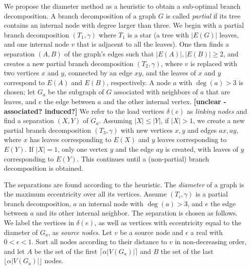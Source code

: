 We propose the diameter method \cite{misc:Hicks04} as a heuristic to obtain a sub-optimal branch decomposition.
A branch decomposition of a graph $G$ is called {\em partial} if its tree contains an internal node with degree larger than three. 
We begin with a partial branch decomposition $(T_1, \gamma)$ where $T_1$ is a star (a tree with $|E(G)|$ leaves, and one internal node $v$ that is adjacent to all the leaves).
One then finds a separation $(A,B)$ of the graph's edges such that $|E(A)|, |E(B)| \geq 2$, and creates a new partial branch decomposition $(T_2, \gamma)$, where $v$ is replaced with two vertices $x$ and $y$, connected by an edge $xy$, and the leaves of $x$ and $y$ correspond to $E(A)$ and $E(B)$, respectively.
A node $a$ with $\deg(a)>3$ is chosen; let $G_a$ be the subgraph of $G$ associated with neighbors of $a$ that are leaves, and $e$ the edge between $a$ and the other internal vertex. \textbf{[unclear - associated? induced?]}
We refer to the load vertices $\delta(e)$ as {\em linking nodes} and find a separation $(X,Y)$ of $G_a$.
Assuming $|X| \leq |Y|$, if $|X|>1$, we create a new partial branch decomposition $(T_3, \gamma)$ with new vertices $x,y$ and edges $ax, ay$, where $x$ has leaves corresponding to $E(X)$ and $y$ leaves corresponding to $E(Y)$.
If $|X|=1$, only one vertex $y$ and the edge $ay$ is created, with leaves of $y$ corresponding to $E(Y)$.
This continues until a (non-partial) branch decomposition is obtained.

The separations are found according to the heuristic.
The {\em diameter} of a graph is the maximum eccentricity over all its vertices.
Assume $(T_i, \gamma)$ is a partial branch decomposition, $a$ an internal node with $\deg(a) > 3$, and $e$ the edge between $a$ and its other internal neighbor.
The separation is chosen as follows.
We label the vertices in $\delta(e)$, as well as vertices with eccentricity equal to the diameter of $G_a$, as {\em source nodes}.
Let $v$ be a source node and $\epsilon$ a real with $0 < \epsilon < 1$.
Sort all nodes according to their distance to $v$ in non-decreasing order, and let $A$ be the set of the first $\lceil \alpha |V(G_a)| \rceil$ and $B$ the set of the last $\lfloor \alpha |V(G_a)| \rfloor$ nodes.

